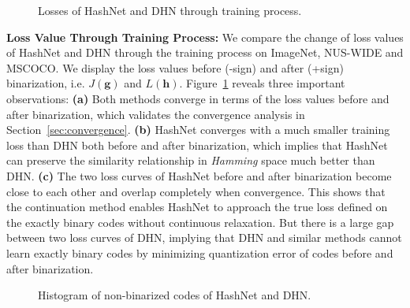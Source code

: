 \documentclass[10pt,twocolumn,letterpaper]{article}
\begin{document}
\begin{figure}[!tbp]
  \centering
  \caption{Losses of HashNet and DHN through training process.}
  \label{fig:loss_value}
  \vspace{-10pt}
\end{figure}

\textbf{Loss Value Through Training Process:} We compare the change of loss values of HashNet and DHN through the training process on ImageNet, NUS-WIDE and MSCOCO. We display the loss values before (-sign) and after (+sign) binarization, i.e. $J({\bm g})$ and $L({\bm h})$. Figure~\ref{fig:loss_value} reveals three important observations: \textbf{(a)} Both methods converge in terms of the loss values before and after binarization, which validates the convergence analysis in Section~\ref{sec:convergence}. \textbf{(b)} HashNet converges with a much smaller training loss than DHN both before and after binarization, which implies that HashNet can preserve the similarity relationship in \emph{Hamming} space much better than DHN. \textbf{(c)} The two loss curves of HashNet before and after binarization become close to each other and overlap completely when convergence. This shows that the continuation method enables HashNet to approach the true loss defined on the exactly binary codes without continuous relaxation. But there is a large gap between two loss curves of DHN, implying that DHN and similar methods \cite{cite:CVPR15SDH,cite:IJCAI16DPSH,cite:CVPR2016DSH} cannot learn exactly binary codes by minimizing quantization error of codes before and after binarization.

\begin{figure}[!tbp]
  \centering
  \caption{Histogram of non-binarized codes of HashNet and DHN.}
  \label{fig:hist}
  \vspace{-10pt}
\end{figure}
\end{document}
